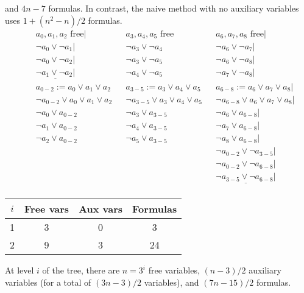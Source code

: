 \documentclass{article}
\begin{document}
and $4n-7$ formulas.
In contrast,
the naive method with no auxiliary variables
uses $1+(n^2-n)/2$ formulas.
\begin{align*}
  && a_0, a_1, a_2 \text{ free}|
  && a_3, a_4, a_5 \text{ free}
  && a_6, a_7, a_8 \text{ free}| \\
  && \lnot a_0 \lor \lnot a_1|
  && \lnot a_3 \lor \lnot a_4
  && \lnot a_6 \lor \lnot a_7| \\
  && \lnot a_0 \lor \lnot a_2|
  && \lnot a_3 \lor \lnot a_5
  && \lnot a_6 \lor \lnot a_8| \\
  && \underline{\lnot a_1 \lor \lnot a_2|}
  && \lnot a_4 \lor \lnot a_5
  && \lnot a_7 \lor \lnot a_8| \\
  && a_{0-2} := a_0 \lor a_1 \lor a_2
  && a_{3-5} := a_3 \lor a_4 \lor a_5
  && a_{6-8} := a_6 \lor a_7 \lor a_8| \\
  && \lnot a_{0-2} \lor a_0 \lor a_1 \lor a_2
  && \lnot a_{3-5} \lor a_3 \lor a_4 \lor a_5
  && \lnot a_{6-8} \lor a_6 \lor a_7 \lor a_8| \\
  && \lnot a_0 \lor a_{0-2}
  && \lnot a_3 \lor a_{3-5}
  && \lnot a_6 \lor a_{6-8}| \\
  && \lnot a_1 \lor a_{0-2}
  && \lnot a_4 \lor a_{3-5}
  && \lnot a_7 \lor a_{6-8}| \\
  && \lnot a_2 \lor a_{0-2}
  && \lnot a_5 \lor a_{3-5}
  && \lnot a_8 \lor a_{6-8}| \\
  && && && \lnot a_{0-2} \lor \lnot a_{3-5}| \\
  && && && \lnot a_{0-2} \lor \lnot a_{6-8}| \\
  && && && \underline{\lnot a_{3-5} \lor \lnot a_{6-8}|} \\
\end{align*}
\begin{center}
  \begin{tabular}{|c|c|c|c|}
    \hline
    $i$ & Free vars & Aux vars & Formulas \\ \hline
    1 & 3 & 0 & 3 \\ \hline
    2 & 9 & 3 & 24 \\ \hline
  \end{tabular}
\end{center}

At level $i$ of the tree,
there are $n=3^i$ free variables,
$(n-3)/2$ auxiliary variables
(for a total of $(3n-3)/2$ variables),
and $(7n-15)/2$ formulas.
\end{document}
